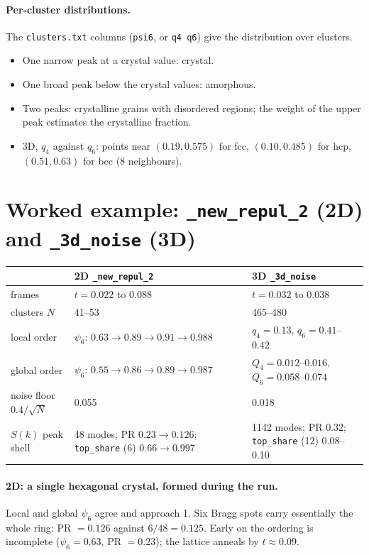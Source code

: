 \documentclass[11pt]{article}
\newcommand{\code}[1]{\texttt{#1}}
\begin{document}
\paragraph{Per-cluster distributions.} The \code{clusters.txt} columns
(\code{psi6}, or \code{q4 q6}) give the distribution over clusters.
\begin{itemize}[nosep]
  \item One narrow peak at a crystal value: crystal.
  \item One broad peak below the crystal values: amorphous.
  \item Two peaks: crystalline grains with disordered regions; the weight of
        the upper peak estimates the crystalline fraction.
  \item 3D, $q_4$ against $q_6$: points near $(0.19, 0.575)$ for fcc,
        $(0.10, 0.485)$ for hcp, $(0.51, 0.63)$ for bcc (8 neighbours).
\end{itemize}

\section{\texorpdfstring{Worked example: \code{\_new\_repul\_2} (2D) and \code{\_3d\_noise} (3D)}{Worked example}}

\begin{center}
\begin{tabularx}{\textwidth}{@{}l L L@{}}
\toprule
 & 2D \code{\_new\_repul\_2} & 3D \code{\_3d\_noise} \\
\midrule
frames & $t=0.022$ to $0.088$ & $t=0.032$ to $0.038$ \\
clusters $N$ & 41--53 & 465--480 \\
local order & $\psi_6$: $0.63\to0.89\to0.91\to0.988$ & $q_4=0.13$, $q_6=0.41$--$0.42$ \\
global order & $\psi_6$: $0.55\to0.86\to0.89\to0.987$ & $Q_4=0.012$--$0.016$, $Q_6=0.058$--$0.074$ \\
noise floor $0.4/\sqrt N$ & 0.055 & 0.018 \\
$S(k)$ peak shell & 48 modes; PR $0.23\to0.126$; \code{top\_share} (6) $0.66\to0.997$ & 1142 modes; PR 0.32; \code{top\_share} (12) 0.08--0.10 \\
\bottomrule
\end{tabularx}
\end{center}

\paragraph{2D: a single hexagonal crystal, formed during the run.} Local and
global $\psi_6$ agree and approach 1. Six Bragg spots carry essentially the
whole ring: PR $=0.126$ against $6/48=0.125$. Early on the ordering is
incomplete ($\psi_6=0.63$, PR $=0.23$); the lattice anneals by $t\approx0.09$.
\end{document}

